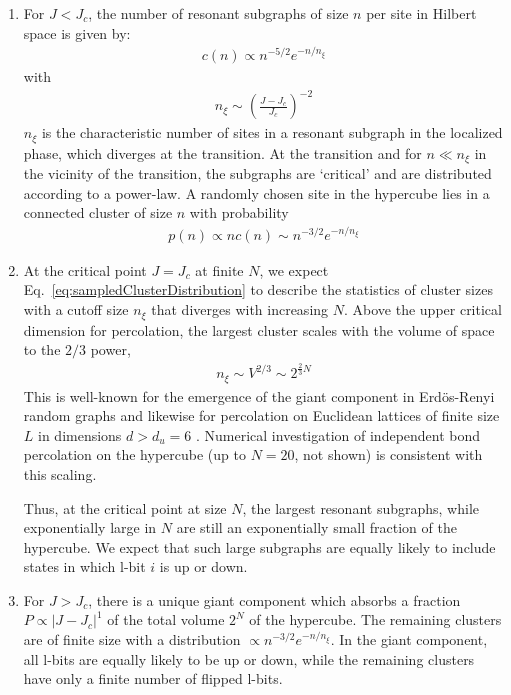 \documentclass[aps,pra,twocolumn,a4paper,showpacs,superscriptaddress,floatfix,10pt]{revtex4}
\begin{document}
\begin{enumerate}
\item For $J< J_c$, the number of resonant subgraphs of size $n$ per site in Hilbert space is given by:
\begin{align}
	c(n) \propto n^{-5/2} e^{-n/n_\xi} \label{Eq:ClusterSizeDist}
\end{align}
with
\begin{align}
	n_\xi \sim \left(\frac{J - J_c}{J_c}\right)^{-2}
\end{align}
$n_\xi$ is the characteristic number of sites in a resonant subgraph in the localized phase, which diverges at the transition. At the transition and for $n\ll n_\xi$ in the vicinity of the transition, the subgraphs are `critical' and are distributed according to a power-law.
A randomly chosen site in the hypercube lies in a connected cluster of size $n$ with probability
\begin{align}
\label{eq:sampledClusterDistribution}
	p(n) \propto n c(n) \sim n^{-3/2} e^{-n / n_\xi}
\end{align}


\item
At the critical point $J = J_c$ at finite $N$, we expect Eq.~\eqref{eq:sampledClusterDistribution} to describe the statistics of cluster sizes with a cutoff size $n_\xi$ that diverges with increasing $N$.
Above the upper critical dimension for percolation, the largest cluster scales with the volume of space to the $2/3$ power,
\begin{align}
 	n_\xi \sim V^{2/3} \sim 2^{\frac{2}{3}N}
	\label{Eq:nxiCritical}
\end{align}
This is well-known for the emergence of the giant component in Erd\"os-Renyi random graphs and likewise for percolation on Euclidean lattices of finite size $L$ in dimensions $d > d_u = 6$ \cite{Borgs:2001fw,Bollobas:2001sj}.
Numerical investigation of independent bond percolation on the hypercube (up to $N=20$, not shown) is consistent with this scaling.

Thus, at the critical point at size $N$, the largest resonant subgraphs, while exponentially large in $N$ are still an exponentially small fraction of the hypercube.
We expect that such large subgraphs are equally likely to include states in which l-bit $i$ is up or down.

\item For $J > J_c$, there is a unique giant component which absorbs a fraction $P \propto |J - J_c|^1$ of the total volume $2^N$ of the hypercube. The remaining clusters are of finite size with a distribution $\propto n^{-3/2} e^{- n / n_\xi}$.  In the giant component, all l-bits are equally likely to be up or down, while the remaining clusters have only a finite number of flipped l-bits.


\end{enumerate}
\end{document}
